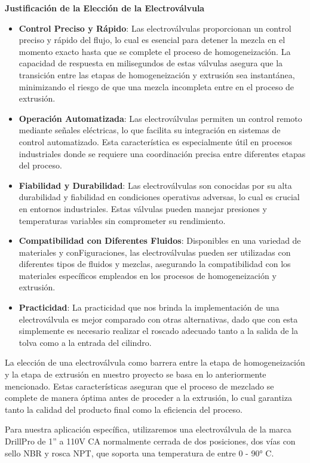 \documentclass[14pt,oneside]{extarticle} %
\begin{document}
\textbf{Justificación de la Elección de la Electroválvula}
\begin{itemize}
    \item \textbf{Control Preciso y Rápido}: Las electroválvulas proporcionan un control preciso y rápido del flujo, lo cual es esencial para detener la mezcla en el momento exacto hasta que se complete el proceso de homogeneización. La capacidad de respuesta en milisegundos de estas válvulas asegura que la transición entre las etapas de homogeneización y extrusión sea instantánea, minimizando el riesgo de que una mezcla incompleta entre en el proceso de extrusión.
    \item \textbf{Operación Automatizada}: Las electroválvulas permiten un control remoto mediante señales eléctricas, lo que facilita su integración en sistemas de control automatizado. Esta característica es especialmente útil en procesos industriales donde se requiere una coordinación precisa entre diferentes etapas del proceso.
    \item \textbf{Fiabilidad y Durabilidad}: Las electroválvulas son conocidas por su alta durabilidad y fiabilidad en condiciones operativas adversas, lo cual es crucial en entornos industriales. Estas válvulas pueden manejar presiones y temperaturas variables sin comprometer su rendimiento.
    \item \textbf{Compatibilidad con Diferentes Fluidos}: Disponibles en una variedad de materiales y conFiguraciones, las electroválvulas pueden ser utilizadas con diferentes tipos de fluidos y mezclas, asegurando la compatibilidad con los materiales específicos empleados en los procesos de homogeneización y extrusión.
    \item \textbf{Practicidad}: La practicidad que nos brinda la implementación de una electroválvula es mejor comparado con otras alternativas, dado que con esta simplemente es necesario realizar el roscado adecuado tanto a la salida de la tolva como a la entrada del cilindro. 
\end{itemize}

La elección de una electroválvula como barrera entre la etapa de homogeneización y la etapa de extrusión en nuestro proyecto se basa en lo anteriormente mencionado. Estas características aseguran que el proceso de mezclado se complete de manera óptima antes de proceder a la extrusión, lo cual garantiza tanto la calidad del producto final como la eficiencia del proceso.

Para nuestra aplicación específica, utilizaremos una electroválvula de la marca DrillPro de 1'' a 110V CA normalmente cerrada de dos posiciones, dos vías con sello NBR y rosca NPT, que soporta una temperatura de entre 0 - 90° C.
\end{document}

